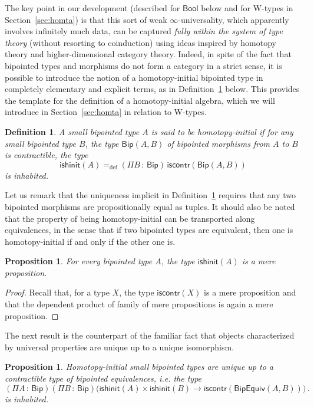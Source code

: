 \documentclass[10pt,a4paper,oneside,reqno]{amsart}
\numberwithin{equation}{section}
\theoremstyle{mythm}
\newtheorem{proposition}[theorem]{Proposition}
\theoremstyle{mydef}
\newtheorem{definition}[theorem]{Definition}
\theoremstyle{myrmk}
\newcommand{\ie}{\text{i.e.\ }}
\newcommand{\defeq}{=_{\mathrm{def}}}
\newcommand{\co}{\,{:}\,}
\newcommand{\iscontr}{\mathsf{iscontr}}
\newcommand{\ishinit}{\mathsf{ishinit}}
\newcommand{\isbiphinit}{\mathsf{ishinit}}
\newcommand{\Bool}{\mathsf{Bool}}
\newcommand{\W}{\mathrm{W}}
\newcommand{\Bip}{\mathsf{Bip}}
\newcommand{\BipHom}{\mathsf{Bip}}
\newcommand{\BipEquiv}{\mathsf{BipEquiv}}
\begin{document}
The key point in our development (described for $\Bool$ below and for $\W$-types in Section~\ref{sec:homta}) is that this sort of weak $\infty$-universality, which apparently involves infinitely much data, can be captured \emph{fully within the system of type theory} (without resorting to coinduction) using ideas inspired by homotopy theory and higher-dimensional category theory. Indeed, in spite of the fact that bipointed types and morphisms do not form a category in a strict sense, it is possible to introduce the  notion of a homotopy-initial bipointed type in completely elementary and explicit terms, as in Definition~\ref{def:BoolInit} below. This provides the template for the definition of a homotopy-initial algebra, which we will introduce in Section~\ref{sec:homta} in relation to $\W$-types.



\begin{definition}\label{def:BoolInit}
A small bipointed type $A$ is said to be \emph{homotopy-initial}  if for any small bipointed type $B$, the type $\BipHom(A,B)$ of bipointed morphisms from $A$ to $B$
is contractible, \ie the type
\[
\ishinit(A) \defeq (\Pi B \co \Bip) \, \iscontr(\BipHom(A, B) )
\] 
is inhabited.
\end{definition}

Let us remark that the uniqueness implicit in Definition~\ref{def:BoolInit} requires that any two bipointed morphisms are propositionally equal as tuples. It should also be noted that the property of being  homotopy-initial  can be transported along equivalences, in the sense that if two bipointed types are equivalent, then one is homotopy-initial if and only if the other one is.  

\begin{proposition} \label{thm:isbiphinitishprop} For every bipointed type $A$, the type $\ishinit(A)$ is a mere proposition.
\end{proposition}

\begin{proof} Recall that, for a type $X$, the type $\iscontr(X)$ is a mere proposition and that the dependent product of family of mere propositions is again a mere proposition. 
\end{proof} 

The next result is the counterpart of the familiar fact that objects characterized by universal properties are unique up to a unique isomorphism.

\begin{proposition} \label{BoolHInitIso} 
Homotopy-initial small bipointed types are unique up to a contractible type of bipointed equivalences, i.e. the type
\[ 
(\Pi A \co \Bip) (\Pi B \co \Bip)
\big( \isbiphinit(A) \times \isbiphinit(B) \to \iscontr(\BipEquiv(A,B)) \big) \, .
\] 
is inhabited.
\end{proposition}
\end{document}
